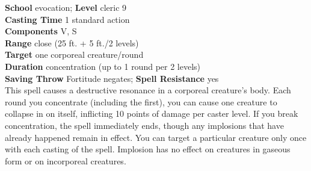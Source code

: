 \textbf{School} evocation; \textbf{Level} cleric 9\\
\textbf{Casting Time} 1 standard action\\
\textbf{Components} V, S\\
\textbf{Range} close (25 ft. + 5 ft./2 levels)\\
\textbf{Target} one corporeal creature/round\\
\textbf{Duration} concentration (up to 1 round per 2 levels)\\
\textbf{Saving Throw} Fortitude negates; \textbf{Spell Resistance} yes\\
This spell causes a destructive resonance in a corporeal creature's body. Each round you concentrate (including the first), you can cause one creature to collapse in on itself, inflicting 10 points of damage per caster level. If you break concentration, the spell immediately ends, though any implosions that have already happened remain in effect. You can target a particular creature only once with each casting of the spell. Implosion has no effect on creatures in gaseous form or on incorporeal creatures.\\
